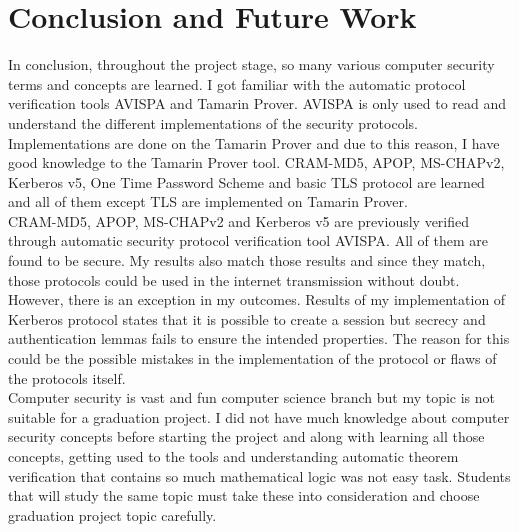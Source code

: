 \documentclass[a4paper, 12pt, titlepage]{article}
\begin{document}
\section{Conclusion and Future Work}
In conclusion, throughout the project stage, so many  various computer security terms and concepts are learned. I got familiar with the automatic protocol verification tools AVISPA and Tamarin Prover. AVISPA is only used to read and understand the different implementations of the security protocols. Implementations are done on the Tamarin Prover and due to this reason, I have good knowledge to the Tamarin Prover tool. CRAM-MD5, APOP, MS-CHAPv2, Kerberos v5, One Time Password Scheme \cite{otparticle} and basic TLS protocol are learned and all of them except TLS are implemented on Tamarin Prover.
\bigskip
\\CRAM-MD5, APOP, MS-CHAPv2 and Kerberos v5 are previously verified through automatic security protocol verification tool AVISPA. All of them are found to be secure. My results also match those results and since they match, those protocols could be used in the internet transmission without doubt. However, there is an exception in my outcomes. Results of my implementation of Kerberos protocol states that it is possible to create a session but secrecy and authentication lemmas fails to ensure the intended properties. The reason for this could be the possible mistakes in the implementation of the protocol or flaws of the protocols itself.
\bigskip
\\Computer security is vast and fun computer science branch but my topic is not suitable for a graduation project. I did not have much knowledge about computer security concepts before starting the project and along with learning all those concepts, getting used to the tools and understanding automatic theorem verification that contains so much mathematical logic was not easy task. Students that will study the same topic must take these into consideration and choose graduation project topic carefully.
\newpage


\newpage
\end{document}
